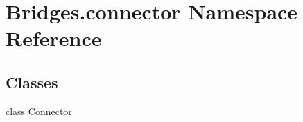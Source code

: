 \hypertarget{namespace_bridges_1_1connector}{}\section{Bridges.\+connector Namespace Reference}
\label{namespace_bridges_1_1connector}
\subsection*{Classes}
\begin{DoxyCompactItemize}
\item 
class \mbox{\hyperlink{class_bridges_1_1connector_1_1_connector}{Connector}}
\end{DoxyCompactItemize}
